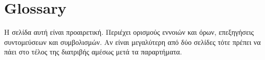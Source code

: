 \chapter*{Glossary}

Η σελίδα αυτή είναι προαιρετική. Περιέχει ορισμούς εννοιών και
όρων, επεξηγήσεις συντομεύσεων και συμβολισμών. Αν είναι
μεγαλύτερη από δύο σελίδες τότε πρέπει να πάει στο τέλος της
διατριβής αμέσως μετά τα παραρτήματα.
